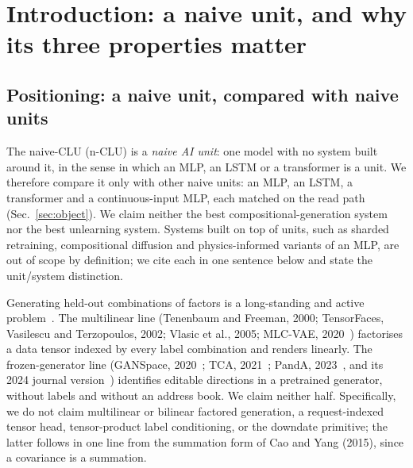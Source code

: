 \documentclass{article} %
\begin{document}
\section{Introduction: a naive unit, and why its three properties matter}
\label{sec:intro}

\subsection{Positioning: a naive unit, compared with naive units}
\label{sec:positioning}

The naive-CLU (n-CLU) is a \emph{naive AI unit}: one model with no system built around it, in the sense
in which an MLP, an LSTM or a transformer is a unit. We therefore compare it only with other naive
units: an MLP, an LSTM, a transformer and a continuous-input MLP, each matched on the read path
(Sec.~\ref{sec:object}). We claim neither the best compositional-generation system nor the best
unlearning system. Systems built on top of units, such as sharded retraining, compositional
diffusion and physics-informed variants of an MLP, are out of scope by definition; we cite each
in one sentence below and state the unit/system distinction.

Generating held-out combinations of factors is a long-standing and active problem~\citep{du2020compositional,liu2022compositional}. The multilinear line (Tenenbaum and Freeman, 2000\nocite{tenenbaum2000separating}; TensorFaces,
Vasilescu and Terzopoulos, 2002\nocite{vasilescu2002tensorfaces}; Vlasic et al., 2005\nocite{vlasic2005face}; MLC-VAE, 2020~\citep{georgopoulos2020multilinear}) factorises a data tensor
indexed by every label combination and renders linearly. The frozen-generator line (GANSpace,
2020~\citep{harkonen2020ganspace}; TCA, 2021~\citep{oldfield2021tensor}; PandA, 2023~\citep{oldfield2023panda}, and its 2024 journal version~\citep{oldfield2024bilinear}) identifies editable directions in a
pretrained generator, without labels and without an address book. We claim neither half.
Specifically, we do not claim multilinear or bilinear factored generation, a request-indexed
tensor head, tensor-product label conditioning, or the downdate primitive; the latter follows
in one line from the summation form of Cao and Yang (2015)\nocite{cao2015towards}, since a covariance is a summation.
\end{document}
